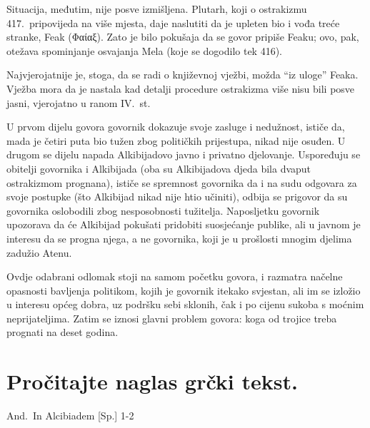 Situacija, međutim, nije posve izmišljena. Plutarh, koji o ostrakizmu 417.\ pripovijeda na više mjesta, daje naslutiti da je upleten bio i vođa treće stranke, Feak (Φαίαξ). Zato je bilo pokušaja da se govor pripiše Feaku; ovo, pak, otežava spominjanje osvajanja Mela (koje se dogodilo tek 416). 

Najvjerojatnije je, stoga, da se radi o književnoj vježbi, možda ``iz uloge'' Feaka. Vježba mora da je nastala kad detalji procedure ostrakizma više nisu bili posve jasni, vjerojatno u ranom IV.~st.

U prvom dijelu govora govornik dokazuje svoje zasluge i nedužnost, ističe da, mada je četiri puta bio tužen zbog političkih prijestupa, nikad nije osuđen. U drugom se dijelu napada Alkibijadovo javno i privatno djelovanje. Uspoređuju se obitelji govornika i Alkibijada (oba su Alkibijadova djeda bila dvaput ostrakizmom prognana), ističe se spremnost govornika da i na sudu odgovara za svoje postupke (što Alkibijad nikad nije htio učiniti), odbija se prigovor da su govornika oslobodili zbog nesposobnosti tužitelja. Naposljetku govornik upozorava da će Alkibijad pokušati pridobiti suosjećanje publike, ali u javnom je interesu da se progna njega, a ne govornika, koji je u prošlosti mnogim djelima zadužio Atenu.

Ovdje odabrani odlomak stoji na samom početku govora, i razmatra načelne opasnosti bavljenja politikom, kojih je govornik itekako svjestan, ali im se izložio u interesu općeg dobra, uz podršku sebi sklonih, čak i po cijenu sukoba s moćnim neprijateljima. Zatim se iznosi glavni problem govora: koga od trojice treba prognati na deset godina.

\newpage

\section*{Pročitajte naglas grčki tekst.}

And.\ In Alcibiadem [Sp.] 1-2


\medskip



